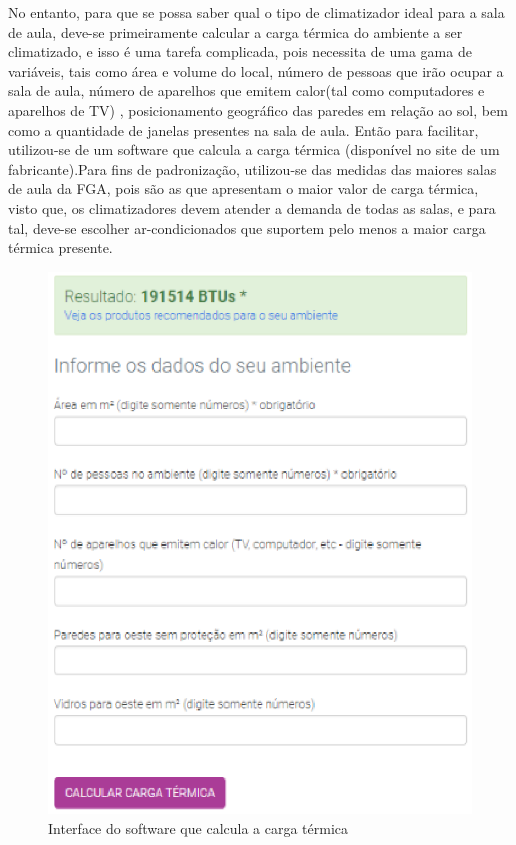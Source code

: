 No entanto, para que se possa saber qual o tipo de climatizador ideal para a sala de aula, deve-se primeiramente calcular a carga térmica do ambiente a ser climatizado, e isso é uma tarefa complicada, pois necessita de uma gama de variáveis, tais como área e volume do local, número de pessoas que irão ocupar a sala de aula, número de aparelhos que emitem calor(tal como computadores e aparelhos de TV) , posicionamento geográfico das paredes em relação ao sol, bem como a quantidade de janelas presentes na sala de aula.
Então para facilitar, utilizou-se de um software que calcula a carga térmica (disponível no site de um fabricante).Para fins de padronização, utilizou-se das medidas das maiores salas de aula da FGA, pois são as que apresentam o maior valor de carga térmica, visto que, os climatizadores devem atender a demanda de todas as salas, e para tal, deve-se escolher ar-condicionados que suportem pelo menos a maior carga térmica presente.

\begin{figure}[!h]
  \centering
  \includegraphics[keepaspectratio=true,scale=1]{figuras/interface_calculo_carga_termica.eps}
  \caption{Interface do software que calcula a carga térmica}
  \label{fig:calculo_carga_termica}
\end{figure}


